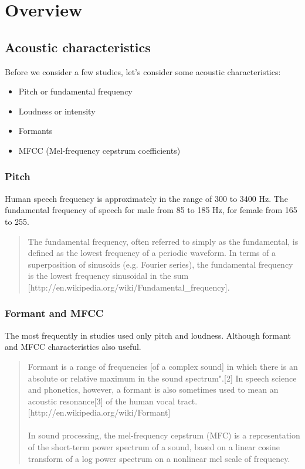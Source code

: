 \documentclass[12pt, letterpaper]{article}
\begin{document}
\section{Overview}
\subsection{Acoustic characteristics}
Before we consider a few studies, let's consider some acoustic characteristics:
\begin{itemize}
	\item Pitch or fundamental frequency
	\item Loudness or intensity
	\item Formants
	\item MFCC (Mel-frequency cepstrum coefficients)
\end{itemize}

\subsubsection{Pitch}
Human speech frequency is approximately in the range of 300 to 3400 Hz. The fundamental frequency of speech for male from 85 to 185 Hz, for female from 165 to 255.
\begin{quote}
The fundamental frequency, often referred to simply as the fundamental, is defined as the lowest frequency of a periodic waveform. In terms of a superposition of sinusoids (e.g. Fourier series), the fundamental frequency is the lowest frequency sinusoidal in the sum [http://en.wikipedia.org/wiki/Fundamental\_frequency].
\end{quote}

\subsubsection{Formant and MFCC}
The most frequently in studies used only pitch and loudness. Although formant and MFCC characteristics also useful.
\begin{quote}
Formant is a range of frequencies [of a complex sound] in which there is an absolute or relative maximum in the sound spectrum".[2] In speech science and phonetics, however, a formant is also sometimes used to mean an acoustic resonance[3] of the human vocal tract.[http://en.wikipedia.org/wiki/Formant]
\\
\\
In sound processing, the mel-frequency cepstrum (MFC) is a representation of the short-term power spectrum of a sound, based on a linear cosine transform of a log power spectrum on a nonlinear mel scale of frequency.
\end{quote}
\end{document}
